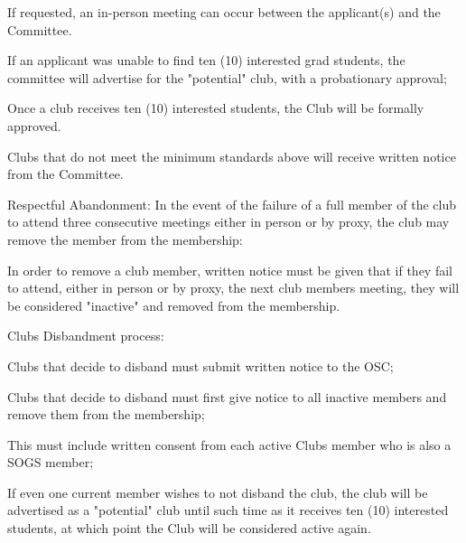 \begin{longenum}[ label*=\thesubsection.\arabic*., align=left]
\begin{longenum}[label*=\arabic*., align=left]
		\begin{longenum}[label*=\arabic*., align=left]
		\item If requested, an in-person meeting can occur between the applicant(s) and the Committee.
		\end{longenum}
	\item If an applicant was unable to find ten (10) interested grad students, the committee will advertise for the "potential" club, with a probationary approval;
		\begin{longenum}[label*=\arabic*., align=left]
		\item Once a club receives ten (10) interested students, the Club will be formally approved.
		\end{longenum}
	\item Clubs that do not meet the minimum standards above will receive written notice from the Committee.
	\end{longenum}
\item Respectful Abandonment: In the event of the failure of a full member of the club to attend three consecutive meetings either in person or by proxy, the club may remove the member from the membership:
	\begin{longenum}[label*=\arabic*., align=left]
	\item In order to remove a club member, written notice must be given that if they fail to attend, either in person or by proxy, the next club members meeting, they will be considered "inactive" and removed from the membership.
	\end{longenum}
\item Clubs Disbandment process:
	\begin{longenum}[label*=\arabic*., align=left]
	\item Clubs that decide to disband must submit written notice to the OSC;
		\begin{longenum}[label*=\arabic*., align=left]	
		\item Clubs that decide to disband must first give notice to all inactive members and remove them from the membership;
		\item This must include written consent from each active Clubs member who is also a SOGS member;
		\item If even one current member wishes to not disband the club, the club will be advertised as a "potential" club until such time as it receives ten (10) interested students, at which point the Club will be considered active again.		
		\end{longenum}

\end{longenum}
\end{longenum}
